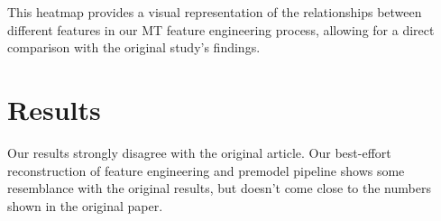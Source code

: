 This heatmap provides a visual representation of the relationships between different features in our MT feature engineering process, allowing for a direct comparison with the original study's findings.


%
%    



\section{Results}
Our results strongly disagree with the original article. Our best-effort reconstruction of feature engineering and premodel pipeline shows some resemblance with the original results, but doesn't come close to the numbers shown in the original paper.

